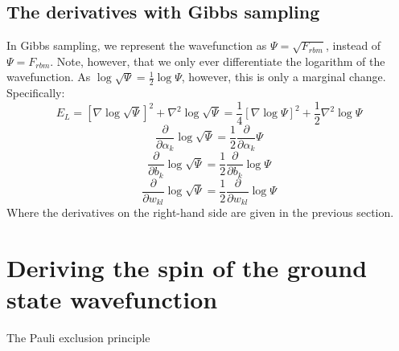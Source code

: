 \documentclass[a4paper, 10pt]{article}
\begin{document}
\begin{appendices}
	\subsection{The derivatives with Gibbs sampling}
	In Gibbs sampling, we represent the wavefunction as $\Psi=\sqrt{F_{rbm}}$, instead of $\Psi=F_{rbm}$. Note, however, that we only ever differentiate the logarithm of the wavefunction. As $\log \sqrt{\Psi}=\frac{1}{2}\log \Psi$, however, this is only a marginal change. Specifically:
	\begin{equation}
	E_L=[\nabla \log \sqrt{\Psi}]^2 + \nabla^2 \log \sqrt{\Psi} =\frac{1}{4}[\nabla \log \Psi]^2 +\frac{1}{2}\nabla^2 \log \Psi
	\end{equation}
	\begin{equation}
	\frac{\partial }{\partial \alpha_k}\log \sqrt{\Psi}=\frac{1}{2}\frac{\partial }{\partial \alpha_k}\Psi
	\end{equation}
	\begin{equation}
	\frac{\partial }{\partial b_k}\log \sqrt{\Psi}=\frac{1}{2}\frac{\partial }{\partial b_k}\log \Psi 
	\end{equation}
	\begin{equation}
	\frac{\partial}{\partial w_{kl}}\log \sqrt{\Psi}=\frac{1}{2}\frac{\partial}{\partial w_{kl}}\log \Psi
	\end{equation}
	Where the derivatives on the right-hand side are given in the previous section.
	\section{Deriving the spin of the ground state wavefunction}
	The Pauli exclusion principle
	\end{appendices}
\end{document}

